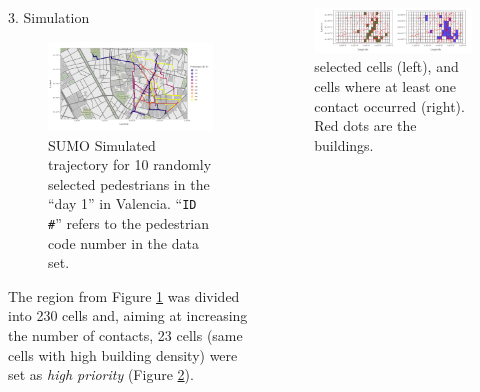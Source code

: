 \documentclass[12pt]{beamer}
\begin{document}
\begin{frame}[t]
\begin{columns}[t]
\begin{column}{0.30\textwidth}
\begin{block}{\Large 3. Simulation}
\begin{figure}[!ht]
					\includegraphics[width = 1\textwidth]{Images/pedestrians}
					
					\vspace{-24pt}
					
					\caption{\justifying SUMO Simulated trajectory for 10 randomly selected pedestrians in the ``day 1'' in Valencia. ``\texttt{ID \#}'' refers to the pedestrian code number in the data set.}
					\label{fig:pedestrians}
				\end{figure}\vspace{-3pt}
				
				
				The region from Figure \ref{fig:pedestrians} was divided into 230 cells and, aiming at increasing the number of contacts, 23 cells (same cells with high building density) were set as \textit{high priority} (Figure \ref{fig:buildings-contacts}).\vspace{12pt}

			\end{block}
			
			
			\end{column}
		
			\begin{column}{0.30\textwidth} \justifying %
				
				\vspace{-10pt}
				\begin{figure}[!ht]
					\centering
					\includegraphics[width = 1\textwidth]{Images/buildings-contacts}
					\caption{ selected cells (left), and cells where at least one contact occurred (right). Red dots are the buildings.}
					\label{fig:buildings-contacts}
				\end{figure}\vspace{-6pt}
				

\end{column}
\end{columns}
\end{frame}
\end{document}
